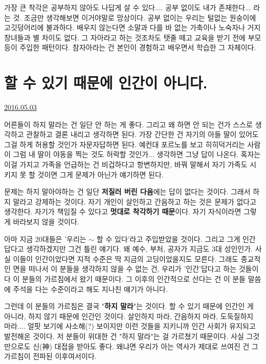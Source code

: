 가장 큰 착각은 공부하지 않아도 나답게 살 수 있다....  공부 없이도 내가 존재한다... 라는 것.
조금만 생각해보면 이거야말로 망상이다. 공부 없이는 우리는 털없는 원숭이에 고깃덩어리에 불과하다.
배우지 않는다면 소말과 다를 바 없는 가축이나 노숙자나 거지 창녀들과 별 차이도 없다.
그 자아라고 하는 것조차도 탯줄 떼고 교육을 받기 전에 부모 등이 주입한 패턴이다.
참자아라는 건 본인이 경험하고 배우면서 학습한 그 자체이다.
\vspace{5mm}






\section{할 수 있기 때문에 인간이 아니다.}
\href{https://www.kockoc.com/Apoc/758394}{2016.05.03}

\vspace{5mm}

어른들이 하지 말라는 건 일단 안 하는 게 좋다. 그리고 왜 하면 안 되는 건가 스스로 생각하고 관찰하고 결론 내리고 생각하면 된다.
가장 간단한 건 자기의 아들 딸이 있어도 그걸 하게 허용할 것인가 자문자답하면 된다.
예컨대 포르노를 보고 히히덕거리는 사람이 그럼 내 딸이 야동을 찍는 것도 허락할 것인가... 생각하면 그냥 답이 나온다.
혹자는 이걸 가지고 가족을 언급하는 건 비겁하다고 항변하지만, 바꿔 말해서 자기 가족도 시키지 못 할 것이면 그게 문제가 아닌가 얘기하면 된다.
\vspace{5mm}

문제는 하지 말아야하는 건 일단 \textbf{저질러 버린 다음}에는 답이 없다는 것이다. 그래서 하지 말라고 강제하는 것이다.
자기 개인이 살인하고 간음하고 하는 것은 문제가 없다고 생각한다. 자기가 책임질 수 있다고 \textbf{멋대로 착각하기 때문}이다.
자기 자식이라면 그렇게 바라보지 않을 것이다.
\vspace{5mm}

아마 지금 20대들은 '우리는 $\sim$ 할 수 있다'라고 주입받았을 것이다. 그리고 그게 인간답다고 생각하겠지만 그건 틀린 얘기다.
왜 예수, 부처, 공자가 지금도 3대 성인인가. 사실 이들이 인간이었다면 지적 수준은 딱 지금의 고딩이었을지도 모른다.
그래도 종교적인 면을 떠나서 이 분들을 생각하지 않을 수 없는 건, 우리가 '인간'답다고 하는 것들이 다 이 분들의 가르침에서 왔기 때문이다.
그 이후의 인간적으로 산다는 건 이 분들 말씀에 주석을 다는 수준이라고 해도 지나친 얘기가 아니다.
\vspace{5mm}

그런데 이 분들의 가르침은 결국 "\textbf{하지 말라}"는 것이다.
할 수 있기 때문에 인간인 게 아니라, 하지 않기 때문에 인간인 것이다.
살인하지 마라, 간음하지 마라, 도둑질하지 마라.... 얼핏 보기에 사소해(?) 보이지만 이런 것들을 지키니까 인간 사회가 유지되고 발전해온 것이다.
저 분들이 위대한 건 "하지 말라"는 걸 가르쳤기 때문이다.
사실 그것만으로도 신(神) 대접을 받아도 좋다. 왜냐면 우리가 아는 역사가 제대로 쓰여진 건 그 가르침이 전파된 이후여서이다.
\vspace{5mm}

